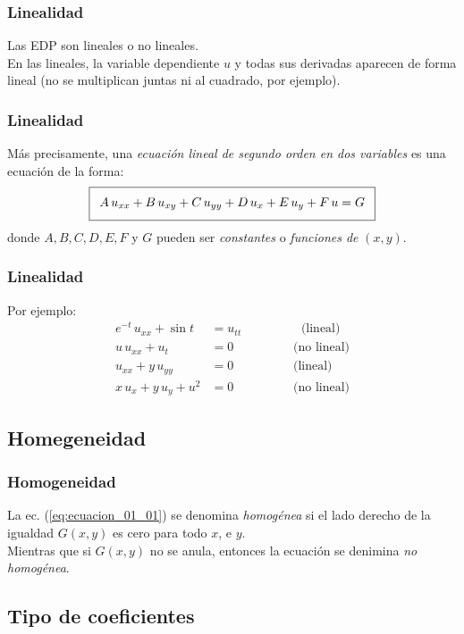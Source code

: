 \documentclass[12pt]{beamer}
\begin{document}
\begin{frame}
\frametitle{Linealidad}
Las EDP son lineales o no lineales.
\\
\bigskip
\pause
En las lineales, la variable dependiente $u$ y todas sus derivadas aparecen de forma lineal (no se multiplican juntas ni al cuadrado, por ejemplo).
\end{frame}
\begin{frame}
\frametitle{Linealidad}
Más precisamente, una \emph{ecuación lineal de segundo orden en dos variables} es una ecuación de la forma:
\pause
\begin{align}
\addtolength{\fboxsep}{5pt}\boxed{ A \, u_{xx} + B \, u_{xy} + C \, u_{yy} + D \, u_{x} + E \, u_{y} + F \, u = G}
\label{eq:ecuacion_01_01}
\end{align}
donde $A, B, C, D, E, F$ y $G$ pueden ser \emph{constantes} o \emph{funciones de} $(x, y)$.
\end{frame}
\begin{frame}
\frametitle{Linealidad}
Por ejemplo:
\pause
\begin{align*}
e^{-t} \, u_{xx} + \sin t &= u_{tt} \hspace{2cm} \mbox{(lineal)} \\[0.5em]
u \, u_{xx} + u_{t} &= 0 \hspace{2cm} \mbox{(no lineal)} \\[0.5em]
u_{xx} + y \, u_{yy} &= 0 \hspace{2cm} \mbox{(lineal)} \\[0.5em]
x \, u_{x} + y \, u_{y} + u^{2} &= 0 \hspace{2cm} \mbox{(no lineal)}
\end{align*}
\end{frame}

\subsection*{Homegeneidad}

\begin{frame}
\frametitle{Homogeneidad}
La ec. (\ref{eq:ecuacion_01_01}) se denomina \emph{homogénea} si el lado derecho de la igualdad $G(x, y)$ es cero para todo $x$, e $y$.
\\
\bigskip
\pause
Mientras que si $G(x, y)$ no se anula, entonces la ecuación se denimina \emph{no homogénea}.
\end{frame}

\subsection*{Tipo de coeficientes}
\end{document}
